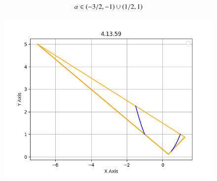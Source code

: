 \documentclass[journal,12pt,onecolumn]{IEEEtran}
\theoremstyle{remark}
\begin{document}
\begin{align}
 \alpha \in \left(-3/2,-1\right) \cup \left(1/2, 1\right)
\end{align}
\begin{figure}[H]
    \centering
    \includegraphics{figs/plot.png}
    \caption*{}
    \label{fig:plot}
\end{figure}
\end{document}
